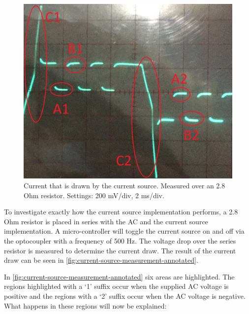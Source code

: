 \begin{figure}[ht]
\begin{minipage}[b]{0.49\textwidth}
			\includegraphics[width=\textwidth]{chapters/hardware-chapters/AC/ac-modulator/custom-hardware/ac-current-source/current-source-measurement-annotated.png}
			\caption{Current that is drawn by the current source. Measured over an 2.8 Ohm resistor. Settings: 200 mV/div, 2 ms/div.}
			\label{fig:current-source-measurement-annotated}
		\end{minipage}
	\end{figure}




	To investigate exactly how the current source implementation performs, a 2.8 Ohm resistor is placed in series with the AC and the current source implementation.
	A micro-controller will toggle the current source on and off via the optocoupler with a frequency of 500 Hz.
	The voltage drop over the series resistor is measured to determine the current draw.
	The result of the current draw can be seen in \autoref{fig:current-source-measurement-annotated}.

	


	In \autoref{fig:current-source-measurement-annotated} six areas are highlighted.
	The regions highlighted with a `1' suffix occur when the supplied AC voltage is positive and the regions with a `2' suffix occur when the AC voltage is negative.
	What happens in these regions will now be explained:


